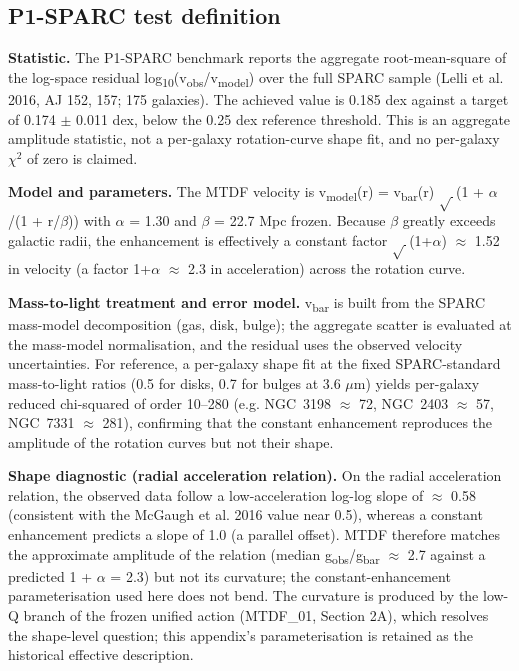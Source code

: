 \documentclass[11pt,a4paper]{article}
\begin{document}
\subsection{P1-SPARC test definition}
\textbf{Statistic.} The P1-SPARC benchmark reports the aggregate root-mean-square of the log-space residual log\textsubscript{10}(v\textsubscript{obs}/v\textsubscript{model}) over the full SPARC sample (Lelli et al. 2016, AJ 152, 157; 175 galaxies). The achieved value is 0.185 dex against a target of 0.174 $\pm$ 0.011 dex, below the 0.25 dex reference threshold. This is an aggregate amplitude statistic, not a per-galaxy rotation-curve shape fit, and no per-galaxy $\chi$$^{2}$ of zero is claimed.

\textbf{Model and parameters.} The MTDF velocity is v\textsubscript{model}(r) = v\textsubscript{bar}(r) $\sqrt{\,}$(1 + $\alpha$/(1 + r/\allowbreak{}$\beta$)) with $\alpha$ = 1.30 and $\beta$ = 22.7 Mpc frozen. Because $\beta$ greatly exceeds galactic radii, the enhancement is effectively a constant factor $\sqrt{\,}$(1+$\alpha$) $\approx$ 1.52 in velocity (a factor 1+$\alpha$ $\approx$ 2.3 in acceleration) across the rotation curve.

\textbf{Mass-to-light treatment and error model.} v\textsubscript{bar} is built from the SPARC mass-model decomposition (gas, disk, bulge); the aggregate scatter is evaluated at the mass-model normalisation, and the residual uses the observed velocity uncertainties. For reference, a per-galaxy shape fit at the fixed SPARC-standard mass-to-light ratios (0.5 for disks, 0.7 for bulges at 3.6 $\mu$m) yields per-galaxy reduced chi-squared of order 10--280 (e.g. NGC~3198 $\approx$ 72, NGC~2403 $\approx$ 57, NGC~7331 $\approx$ 281), confirming that the constant enhancement reproduces the amplitude of the rotation curves but not their shape.

\textbf{Shape diagnostic (radial acceleration relation).} On the radial acceleration relation, the observed data follow a low-acceleration log-log slope of $\approx$ 0.58 (consistent with the McGaugh et al. 2016 value near 0.5), whereas a constant enhancement predicts a slope of 1.0 (a parallel offset). MTDF therefore matches the approximate amplitude of the relation (median g\textsubscript{obs}/g\textsubscript{bar} $\approx$ 2.7 against a predicted 1 + $\alpha$ = 2.3) but not its curvature; the constant-enhancement parameterisation used here does not bend. The curvature is produced by the low-Q branch of the frozen unified action (MTDF\_\allowbreak{}01, Section 2A), which resolves the shape-level question; this appendix's parameterisation is retained as the historical effective description.
\end{document}
